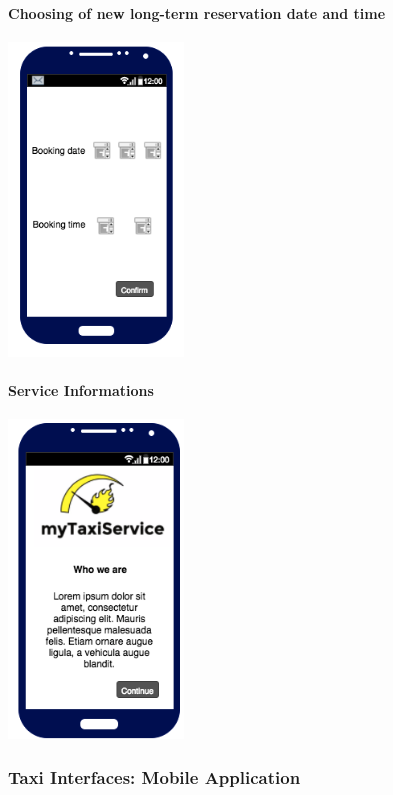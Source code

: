 		\paragraph{Choosing of new long-term reservation date and time}
		\begin{center}
		    \includegraphics[width=0.35\textwidth]{./images/TELEFONO5User}
		\end{center}
		\paragraph{Service Informations}
		\begin{center}
		    \includegraphics[width=0.35\textwidth]{./images/TELEFONO6User}
		\end{center}
		
		
		\subsubsection{Taxi Interfaces: Mobile Application}
